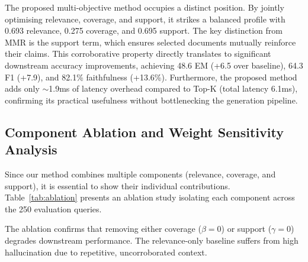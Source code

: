 \documentclass[conference]{IEEEtran}
\begin{document}
The proposed multi-objective method occupies a distinct position. By jointly optimising relevance, coverage, and support, it strikes a balanced profile with 0.693 relevance, 0.275 coverage, and 0.695 support. The key distinction from MMR is the support term, which ensures selected documents mutually reinforce their claims. This corroborative property directly translates to significant downstream accuracy improvements, achieving 48.6 EM (+6.5 over baseline), 64.3 F1 (+7.9), and 82.1\% faithfulness (+13.6\%). Furthermore, the proposed method adds only $\sim$1.9ms of latency overhead compared to Top-K (total latency 6.1ms), confirming its practical usefulness without bottlenecking the generation pipeline.

\subsection{Component Ablation and Weight Sensitivity Analysis}

Since our method combines multiple components (relevance, coverage, and support), it is essential to show their individual contributions. Table~\ref{tab:ablation} presents an ablation study isolating each component across the 250 evaluation queries.

\begin{table}[H]
\centering
\caption{Ablation of individual components on performance and hallucination metrics.}
\label{tab:ablation}
\end{table}

The ablation confirms that removing either coverage ($\beta=0$) or support ($\gamma=0$) degrades downstream performance. The relevance-only baseline suffers from high hallucination due to repetitive, uncorroborated context.
\end{document}
